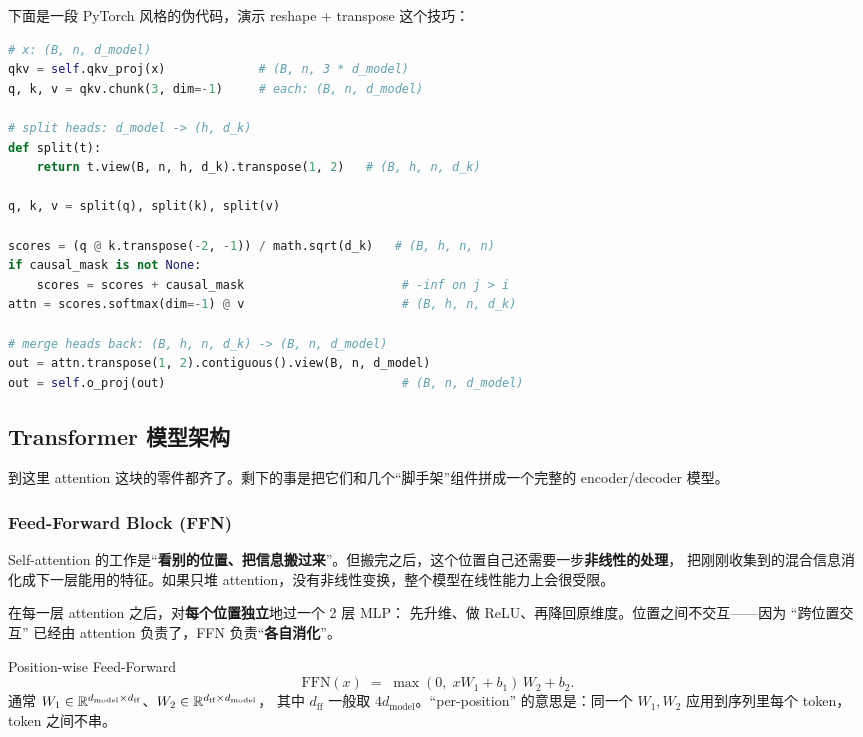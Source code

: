 下面是一段 PyTorch 风格的伪代码，演示 reshape + transpose 这个技巧：

\begin{lstlisting}[language=Python]
# x: (B, n, d_model)
qkv = self.qkv_proj(x)             # (B, n, 3 * d_model)
q, k, v = qkv.chunk(3, dim=-1)     # each: (B, n, d_model)

# split heads: d_model -> (h, d_k)
def split(t):
    return t.view(B, n, h, d_k).transpose(1, 2)   # (B, h, n, d_k)

q, k, v = split(q), split(k), split(v)

scores = (q @ k.transpose(-2, -1)) / math.sqrt(d_k)   # (B, h, n, n)
if causal_mask is not None:
    scores = scores + causal_mask                      # -inf on j > i
attn = scores.softmax(dim=-1) @ v                      # (B, h, n, d_k)

# merge heads back: (B, h, n, d_k) -> (B, n, d_model)
out = attn.transpose(1, 2).contiguous().view(B, n, d_model)
out = self.o_proj(out)                                 # (B, n, d_model)
\end{lstlisting}

\subsection{Transformer 模型架构}
\label{subsec:ch03-arch}

到这里 attention 这块的零件都齐了。剩下的事是把它们和几个``脚手架''组件拼成一个完整的 encoder/decoder 模型。

\subsubsection{Feed-Forward Block (FFN)}

\begin{problemblock}
Self-attention 的工作是``\textbf{看别的位置、把信息搬过来}''。但搬完之后，这个位置自己还需要一步\textbf{非线性的处理}，
把刚刚收集到的混合信息消化成下一层能用的特征。如果只堆 attention，没有非线性变换，整个模型在线性能力上会很受限。
\end{problemblock}

\begin{intuitionblock}
在每一层 attention 之后，对\textbf{每个位置独立}地过一个 2 层 MLP：
先升维、做 ReLU、再降回原维度。位置之间不交互——因为 ``跨位置交互'' 已经由 attention 负责了，FFN 负责``\textbf{各自消化}''。
\end{intuitionblock}

\begin{mathbox}{Position-wise Feed-Forward}
\[
  \mathrm{FFN}(x) \;=\; \max(0,\; x W_1 + b_1)\, W_2 + b_2 .
\]
通常 $W_1 \in \mathbb{R}^{d_{\text{model}} \times d_{\text{ff}}}$、$W_2 \in \mathbb{R}^{d_{\text{ff}} \times d_{\text{model}}}$，
其中 $d_{\text{ff}}$ 一般取 $4 d_{\text{model}}$。``per-position'' 的意思是：同一个 $W_1, W_2$ 应用到序列里每个 token，token 之间不串。
\end{mathbox}

